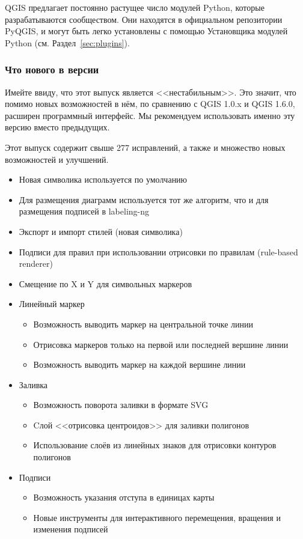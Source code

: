 \begin{enumerate}
\end{enumerate}


QGIS предлагает постоянно растущее число модулей Python, которые
разрабатываются сообществом. Они находятся в официальном
репозитории PyQGIS, и могут быть легко установлены с помощью Установщика
модулей Python (см. Раздел~\ref{sec:plugins}).

\subsubsection{Что нового в версии \CURRENT}

Имейте ввиду, что этот выпуск является <<нестабильным>>. Это значит, что
помимо новых возможностей в нём, по сравнению с QGIS 1.0.x и QGIS 1.6.0,
расширен программный интерфейс. Мы рекомендуем использовать именно эту
версию вместо предыдущих.

Этот выпуск содержит свыше 277 исправлений, а также и множество новых
возможностей и улучшений.


\begin{itemize}[label=--]
\item Новая символика используется по умолчанию
\item Для размещения диаграмм используется тот же алгоритм, что и для
размещения подписей в labeling-ng
\item Экспорт и импорт стилей (новая символика)
\item Подписи для правил при использовании отрисовки по правилам
(rule-based renderer)
\item Смещение по X и Y для символьных маркеров
\item Линейный маркер
\begin{itemize}[label=--]
\item Возможность выводить маркер на центральной точке линии
\item Отрисовка маркеров только на первой или последней вершине линии
\item Возможность выводить маркер на каждой вершине линии
\end{itemize}
\item Заливка
\begin{itemize}[label=--]
\item Возможность поворота заливки в формате SVG
\item Cлой <<отрисовка центроидов>> для заливки полигонов
\item Использование слоёв из линейных знаков для отрисовки контуров полигонов
\end{itemize}
\item Подписи
\begin{itemize}[label=--]
\item Возможность указания отступа в единицах карты
\item Новые инструменты для интерактивного перемещения, вращения и изменения
подписей
\end{itemize}
\end{itemize}

